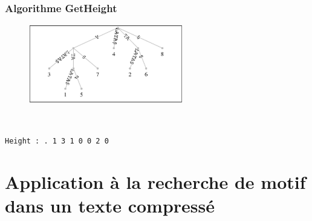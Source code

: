 \documentclass[10pt]{beamer}
\begin{document}
\begin{frame}
\begin{columns}
\begin{minipage}[c][.6\textheight][c]{\linewidth}
{      }

    \end{minipage}
  \end{columns}
  \normalsize
\end{frame}

\begin{frame}
  \frametitle{Algorithme GetHeight}
  \begin{figure}
    \includegraphics[width=0.6\textwidth]{sufftree_atalata}
  \end{figure}
  \hfill \\
  \begin{center}
    \texttt{Height : . 1 3 1 0 0 2 0}
  \end{center}
\end{frame}

\section{Application à la recherche de motif dans un texte compressé}
\label{sec:appcompress}
\end{document}
